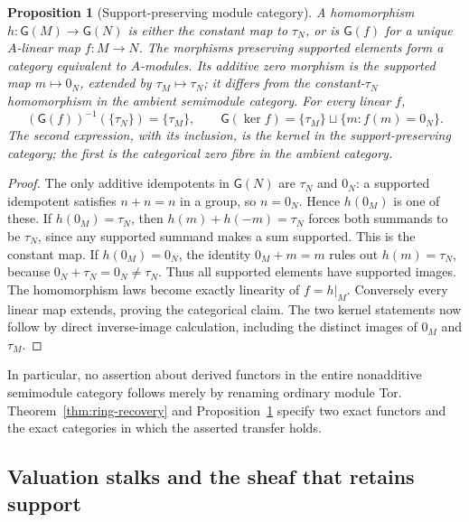 \documentclass[11pt,a4paper]{article}
\newtheorem{proposition}[theorem]{Proposition}
\theoremstyle{definition}\newtheorem{definition}[theorem]{Definition}
\newcommand{\G}{\mathsf G}\newcommand{\Tor}{\operatorname{Tor}}\newcommand{\Frac}{\operatorname{Frac}}
\begin{document}
\begin{proposition}[Support-preserving module category]
\label{prop:module-support}
A homomorphism $h:\G(M)\to\G(N)$ is either the constant map to
$\tau_N$, or is $\G(f)$ for a unique $A$-linear map $f:M\to N$.
The morphisms preserving supported elements form a category equivalent
to $A$-modules. Its additive zero morphism is the supported map
$m\mapsto0_N$, extended by $\tau_M\mapsto\tau_N$; it differs from the
constant-$\tau_N$ homomorphism in the ambient semimodule category.
For every linear $f$,
\[
 (\G(f))^{-1}(\{\tau_N\})=\{\tau_M\},\qquad
 \G(\ker f)=\{\tau_M\}\sqcup\{m:f(m)=0_N\}.
 \tag{AV5.1}\label{eq:module-kernels}
\]
The second expression, with its inclusion, is the kernel in the
support-preserving category; the first is the categorical zero fibre
in the ambient category.
\end{proposition}
\begin{proof}
The only additive idempotents in $\G(N)$ are $\tau_N$ and $0_N$:
a supported idempotent satisfies $n+n=n$ in a group, so $n=0_N$.
Hence $h(0_M)$ is one of these. If $h(0_M)=\tau_N$, then
$h(m)+h(-m)=\tau_N$ forces both summands to be $\tau_N$, since any
supported summand makes a sum supported. This is the constant map.
If $h(0_M)=0_N$, the identity $0_M+m=m$ rules out $h(m)=\tau_N$,
because $0_N+\tau_N=0_N\ne\tau_N$. Thus all supported elements have
supported images. The homomorphism laws become exactly linearity of
$f=h|_M$. Conversely every linear map extends, proving the categorical
claim. The two kernel statements now follow by direct inverse-image
calculation, including the distinct images of $0_M$ and $\tau_M$.
\end{proof}

In particular, no assertion about derived functors in the entire
nonadditive semimodule category follows merely by renaming ordinary
module Tor. Theorem~\ref{thm:ring-recovery} and
Proposition~\ref{prop:module-support} specify two exact functors and
the exact categories in which the asserted transfer holds.

\subsection{Valuation stalks and the sheaf that retains support}
\end{document}
